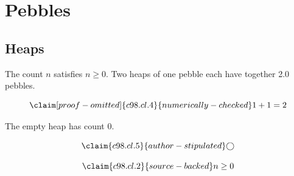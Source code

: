 \chapter{Pebbles}\label{c98}
\section{Heaps}\label{c98.s1}

\begin{theorem}[Count]\label{c98.thm.count}
  The count $n$ satisfies $n \geq 0$.
  Two heaps of one pebble each have together
  \num[c98.cl.4]{2.0}{} pebbles.
\end{theorem}

\begin{equation}\label{c98.eq.sum}\claim[proof-omitted]{c98.cl.4}{numerically-checked}
  1 + 1 = 2
\end{equation}

\begin{lemma}[Empty]\label{c98.lem.empty}
  The empty heap has count $0$.
\end{lemma}

\begin{equation}\label{c98.eq.circle}\claim{c98.cl.5}{author-stipulated}
  \bigcirc
\end{equation}

\begin{vertiefung}[id=c98.v1, titel={T}, wozu={W}, voraussetzung={V}, zurueck={Z}]
  \begin{equation}\label{c98.eq.page}\claim{c98.cl.2}{source-backed}
    n \geq 0
  \end{equation}
\end{vertiefung}
